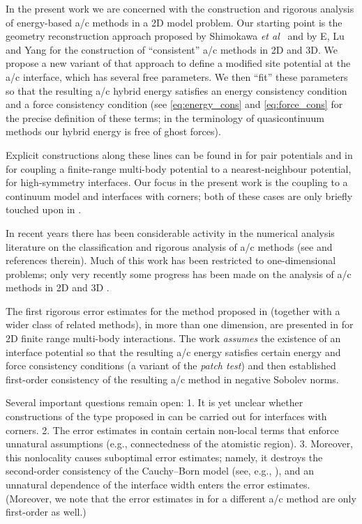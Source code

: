 \documentclass[12pt, reqno, a4paper]{amsart}
\numberwithin{equation}{section}
\numberwithin{theorem}{section}
\numberwithin{remark}{section}
\begin{document}
In the present work we are concerned with the construction and
rigorous analysis of energy-based a/c methods in a 2D model
problem. Our starting point is the geometry reconstruction approach
proposed by Shimokawa {\it et al}~\cite{Shimokawa:2004} and by E, Lu
and Yang \cite{E:2006} for the construction of ``consistent'' a/c
methods in 2D and 3D. We propose a new variant of that approach to
define a modified site potential at the a/c interface, which has
several free parameters. We then ``fit'' these parameters so that the
resulting a/c hybrid energy satisfies an energy consistency condition
and a force consistency condition (see \eqref{eq:energy_cons} and
\eqref{eq:force_cons} for the precise definition of these terms; in
the terminology of quasicontinuum methods our hybrid energy is free of
ghost forces).

Explicit constructions along these lines can be found in
\cite{Shimokawa:2004} for pair potentials and in \cite{E:2006} for
coupling a finite-range multi-body potential to a nearest-neighbour
potential, for high-symmetry interfaces. Our focus in the present work
is the coupling to a continuum model and interfaces with corners; both
of these cases are only briefly touched upon in \cite{E:2006}.

In recent years there has been considerable activity in the numerical
analysis literature on the classification and rigorous analysis of a/c
methods (see \cite{Dobson:2008b, Dobson:qce.stab, emingyang,
  Ortner:qnl.1d, OrtnerWang:2009a} and references therein). Much of
this work has been restricted to one-dimensional problems; only very
recently some progress has been made on the analysis of a/c methods in
2D and 3D \cite{LuMing:2011pre, Ortner:2011:patch, OrtShap:2011a}.

The first rigorous error estimates for the method proposed in
\cite{E:2006} (together with a wider class of related methods), in
more than one dimension, are presented in \cite{Ortner:2011:patch} for
2D finite range multi-body interactions. The work
\cite{Ortner:2011:patch} {\it assumes} the existence of an interface
potential so that the resulting a/c energy satisfies certain energy
and force consistency conditions (a variant of the {\it patch test})
and then established first-order consistency of the resulting a/c
method in negative Sobolev norms.

Several important questions remain open: 1. It is yet unclear whether
constructions of the type proposed in \cite{E:2006, Shimokawa:2004}
can be carried out for interfaces with corners. 2. The error
estimates in \cite{Ortner:2011:patch} contain certain non-local terms
that enforce unnatural assumptions (e.g., connectedness of the
atomistic region). 3. Moreover, this nonlocality causes suboptimal
error estimates; namely, it destroys the second-order consistency of
the Cauchy--Born model (see, e.g., \cite{Dobson:2008b, E:2007a,
  Ortner:qnl.1d}), and an unnatural dependence of the interface width
enters the error estimates. (Moreover, we note that the error
estimates in \cite{OrtShap:2011a} for a different a/c method are only
first-order as well.)
\end{document}
